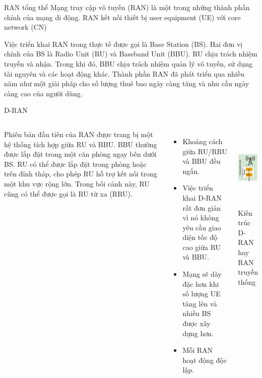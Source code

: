 \begin{frame}{RAN tổng thể}
  Mạng truy cập vô tuyến (RAN) là một trong những thành phần chính của mạng di động. RAN kết nối thiết bị user equipment (UE) với core network (CN)

  \vspace{0.3cm}
  
  Việc triển khai RAN trong thực tế được gọi là Base Station (BS). Hai đơn vị chính của BS là Radio Unit (RU) và Baseband Unit (BBU). RU chịu trách nhiệm truyền và nhận. Trong khi đó, BBU chịu trách nhiệm quản lý vô tuyến, sử dụng tài nguyên và các hoạt động khác.  Thành phần RAN đã phát triển qua nhiều năm như một giải pháp cho số lượng thuê bao ngày càng tăng và nhu cầu ngày càng cao của người dùng.

\end{frame}

\begin{frame}{D-RAN}
  \begin{columns}[T] %
      Phiên bản đầu tiên của RAN được trang bị một hệ thống tích hợp giữa RU và BBU. BBU thường được lắp đặt trong một căn phòng ngay bên dưới BS. RU có thể được lắp đặt trong phòng hoặc trên đỉnh tháp, cho phép RU hỗ trợ kết nối trong một khu vực rộng lớn. Trong bối cảnh này, RU cũng có thể được gọi là RU từ xa (RRU).
      \begin{itemize}
        \item Khoảng cách giữa RU/RRU và BBU đều ngắn.
        \item Việc triển khai D-RAN rất đơn giản vì nó không yêu cầu giao diện tốc độ cao giữa RU và BBU.
        \item Mạng sẽ dày đặc hơn khi số lượng UE tăng lên và nhiều BS được xây dựng hơn.
        \item Mỗi RAN hoạt động độc lập.
      \end{itemize}

      \centering
      \includegraphics[height=4cm, keepaspectratio]{picture/D-RAN.PNG}
      \\[1ex]
      \small Kiến trúc D-RAN hay RAN truyền thống
  \end{columns}
\end{frame}

